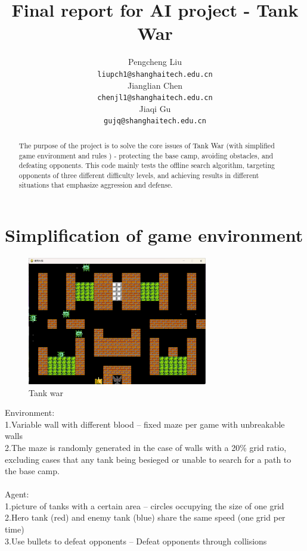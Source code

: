 \documentclass{article}
\title{Final report for AI project - Tank War}
\author{
  Pengcheng Liu \\
  \texttt{liupch1@shanghaitech.edu.cn}\\
      \AND
  Jianglian Chen \\
  \texttt{chenjl1@shanghaitech.edu.cn}\\ 
      \AND 
  Jiaqi Gu  \\
  \texttt{gujq@shanghaitech.edu.cn}  
}
\begin{document}
	
	\maketitle
	
	\begin{abstract}
		The purpose of the project is to solve the core issues of Tank War (with simplified game environment and rules ) - protecting the base camp, avoiding obstacles, and defeating opponents. This code mainly tests the offline search algorithm, targeting opponents of three different difficulty levels, and achieving results in different situations that emphasize aggression and defense.
	\end{abstract}
	
	
	\section{Simplification of game environment}
	\begin{figure}[H]
		\centering
		\includegraphics[width=0.7\textwidth]{game.png}
		\caption{Tank war}
	\end{figure} 
	Environment:\\
	1.Variable wall with different blood -- fixed maze per game with unbreakable walls \\
	2.The maze is randomly generated in the case of walls with a 20\% grid ratio, excluding cases that any tank being besieged or unable to search for a path to the base camp.\\
	\space\\
	Agent:\\
	1.picture of tanks with a certain area -- circles occupying the size of one grid \\
	2.Hero tank (red) and enemy tank (blue) share the same speed (one grid per time)\\
	3.Use bullets to defeat opponents -- Defeat opponents through collisions\\
	
\end{document}
